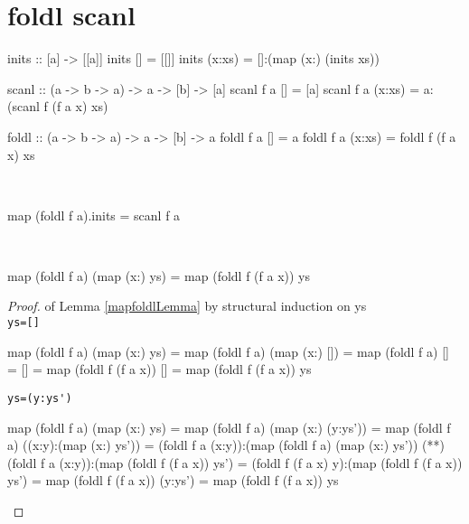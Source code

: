 \section{foldl scanl}
\begin{code}
inits :: [a] -> [[a]]
inits []     = [[]]
inits (x:xs) = []:(map (x:) (inits xs))
\end{code}
\begin{code}
scanl :: (a -> b -> a) -> a -> [b] -> [a]
scanl f a []     = [a]
scanl f a (x:xs) = a:(scanl f (f a x) xs)
\end{code}
\begin{code}
foldl :: (a -> b -> a) -> a -> [b] -> a
foldl f a []     = a
foldl f a (x:xs) = foldl f (f a x) xs
\end{code}
\begin{claim}\label{foldscanClaim}\ 
\begin{code}
map (foldl f a).inits = scanl f a
\end{code}
\end{claim}
\begin{lemma}\label{mapfoldlLemma}\ 
\begin{code}
map (foldl f a) (map (x:) ys) = map (foldl f (f a x)) ys
\end{code}
\end{lemma}
\begin{proof} of Lemma \ref{mapfoldlLemma} by structural induction on ys\\
\verb|ys=[]|
\begin{code}
map (foldl f a) (map (x:) ys)
           = map (foldl f a) (map (x:) [])
           = map (foldl f a) []
           = []
           = map (foldl f (f a x)) []
           = map (foldl f (f a x)) ys
\end{code}
\verb|ys=(y:ys')|
\begin{code}
map (foldl f a) (map (x:) ys)
           = map (foldl f a) (map (x:) (y:ys'))
           = map (foldl f a) ((x:y):(map (x:) ys'))
           = (foldl f a (x:y)):(map (foldl f a) (map (x:) ys'))
           (*\sEq{IH}*) (foldl f a (x:y)):(map (foldl f (f a x)) ys')
           = (foldl f (f a x) y):(map (foldl f (f a x)) ys')
           = map (foldl f (f a x)) (y:ys')
           = map (foldl f (f a x)) ys
\end{code}
\end{proof}
\newpage
